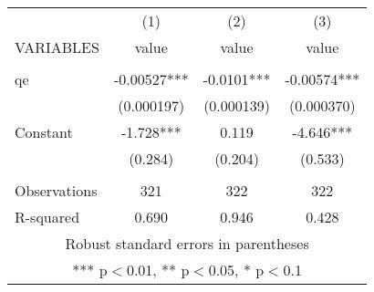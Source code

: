 \documentclass[]{article}
\begin{document}
\begin{tabular}{lccc} \hline
 & (1) & (2) & (3) \\
VARIABLES & value & value & value \\ \hline
 &  &  &  \\
qe & -0.00527*** & -0.0101*** & -0.00574*** \\
 & (0.000197) & (0.000139) & (0.000370) \\
Constant & -1.728*** & 0.119 & -4.646*** \\
 & (0.284) & (0.204) & (0.533) \\
 &  &  &  \\
Observations & 321 & 322 & 322 \\
 R-squared & 0.690 & 0.946 & 0.428 \\ \hline
\multicolumn{4}{c}{ Robust standard errors in parentheses} \\
\multicolumn{4}{c}{ *** p$<$0.01, ** p$<$0.05, * p$<$0.1} \\
\end{tabular}
\end{document}
